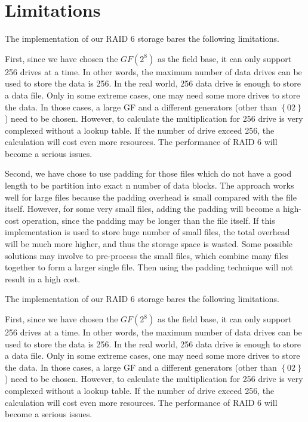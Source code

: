\section{Limitations}

The implementation of our RAID 6 storage bares the following limitations. 

First, since we have chosen the $GF(2^8)$ as the field base, it can only support 256 drives at a time. In other words, the maximum number of data drives can be used to store the data is 256. In the real world, 256 data drive is enough to store a data file. Only in some extreme cases, one may need some more drives to store the data. In those cases, a large GF and a different generators (other than $\left\{02\right\}$) need to be chosen. However, to calculate the multiplication for 256 drive is very complexed without a lookup table. If the number of drive exceed 256, the calculation will cost even more resources. The performance of RAID 6 will become a serious issues.

Second, we have chose to use padding for those files which do not have a good length to be partition into exact n number of data blocks. The approach works well for large files because the padding overhead is small compared with the file itself. However, for some very small files, adding the padding will become a high-cost operation, since the padding may be longer than the file itself. If this implementation is used to store huge number of small files, the total overhead will be much more higher, and thus the storage space is wasted. Some possible solutions may involve to pre-process the small files, which combine many files together to form a larger single file. Then using the padding technique will not result in a high cost.

The implementation of our RAID 6 storage bares the following limitations. 

First, since we have chosen the $GF(2^8)$ as the field base, it can only support 256 drives at a time. In other words, the maximum number of data drives can be used to store the data is 256. In the real world, 256 data drive is enough to store a data file. Only in some extreme cases, one may need some more drives to store the data. In those cases, a large GF and a different generators (other than $\left\{02\right\}$) need to be chosen. However, to calculate the multiplication for 256 drive is very complexed without a lookup table. If the number of drive exceed 256, the calculation will cost even more resources. The performance of RAID 6 will become a serious issues.

